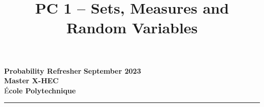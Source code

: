\documentclass{article}
\title{PC 1 – Sets, Measures and Random Variables}
\author{}
\date{}
\begin{document}
\begin{flushleft}
  \textbf{Probability Refresher} \hfill \textbf{September 2023} \\
  \textbf{Master X-HEC} \hfill \\
  É\textbf{cole Polytechnique} \hfill 
\end{flushleft}

{\let\newpage\relax\maketitle}
\vspace{-1.3cm}
\hrule

\vspace{0.5cm}





\end{document}
